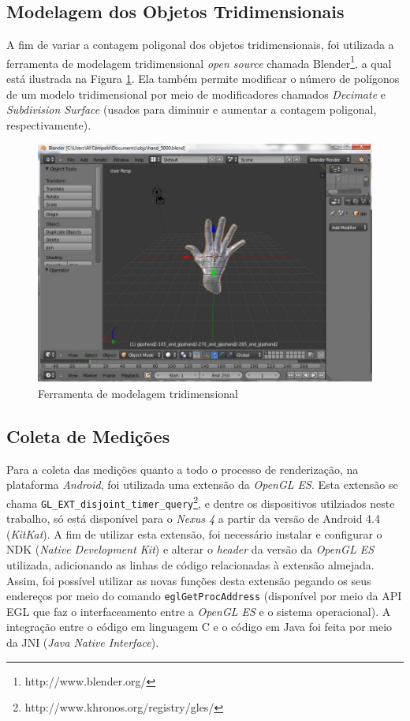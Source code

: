 \subsection{Modelagem dos Objetos Tridimensionais}

 A fim de variar a contagem poligonal dos objetos tridimensionais, foi utilizada a ferramenta de modelagem tridimensional \textit{open source} chamada Blender\footnote{http://www.blender.org/}, a qual está ilustrada na Figura \ref{blender}. Ela também permite modificar o número de polígonos de um modelo tridimensional por meio de modificadores chamados \textit{Decimate} e \textit{Subdivision Surface} (usados para diminuir e aumentar a contagem poligonal, respectivamente). 

	\begin{figure}[ht]
	\centering
		\includegraphics[keepaspectratio=true,scale=0.6]{figuras/blender.jpg}
	\caption{Ferramenta de modelagem tridimensional}
	\label{blender}
	\end{figure}

\subsection{Coleta de Medições}
\label{medicoes}

	Para a coleta das medições quanto a todo o processo de renderização, na plataforma \textit{Android}, foi utilizada uma extensão da \textit{OpenGL ES}. Esta extensão se chama \texttt{GL\_EXT\_disjoint\_timer\_query}\footnote{http://www.khronos.org/registry/gles/}, e dentre os dispositivos utilziados neste trabalho, só está disponível para o \textit{Nexus 4} a partir da versão de Android 4.4 (\textit{KitKat}). A fim de utilizar esta extensão, foi necessário instalar e configurar o NDK (\textit{Native Development Kit}) e alterar o \textit{header} da versão da \textit{OpenGL ES} utilizada, adicionando as linhas de código relacionadas à extensão almejada. Assim, foi possível utilizar as novas funções desta extensão pegando os seus endereços por meio do comando \texttt{eglGetProcAddress} (disponível por meio da API EGL que faz o interfaceamento entre a \textit{OpenGL ES} e o sistema operacional). A integração entre o código em linguagem C e o código em Java foi feita por meio da JNI (\textit{Java Native Interface}). 

